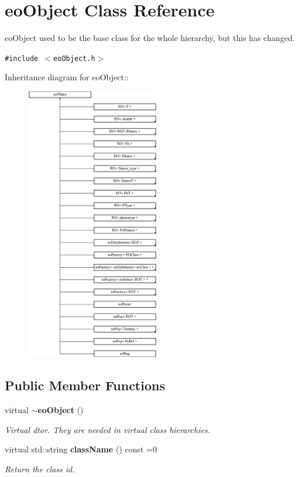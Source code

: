 \section{eo\-Object Class Reference}
\label{classeo_object}
eo\-Object used to be the base class for the whole hierarchy, but this has changed.  


{\tt \#include $<$eo\-Object.h$>$}

Inheritance diagram for eo\-Object::\begin{figure}[H]
\begin{center}
\leavevmode
\includegraphics[height=12cm]{classeo_object}
\end{center}
\end{figure}
\subsection*{Public Member Functions}
\begin{CompactItemize}
\item 
virtual {\bf $\sim$eo\-Object} ()\label{classeo_object_a0}

\begin{CompactList}\small\item\em Virtual dtor. They are needed in virtual class hierarchies. \item\end{CompactList}\item 
virtual std::string {\bf class\-Name} () const =0
\begin{CompactList}\small\item\em Return the class id. \item\end{CompactList}\end{CompactItemize}


